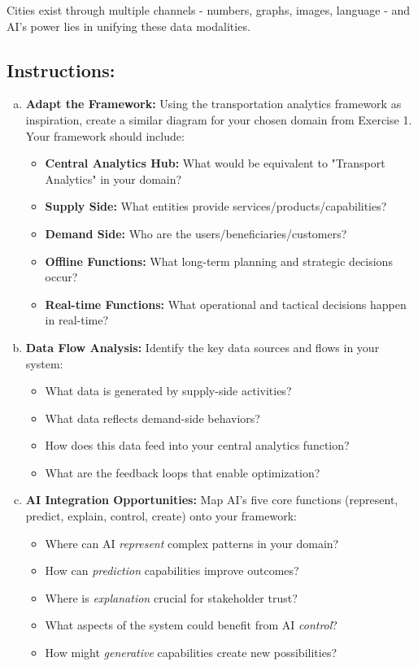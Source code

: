 \documentclass[11pt]{article}
\begin{document}
Cities exist through multiple channels - numbers, graphs, images, language - and AI's power lies in unifying these data modalities.

\subsection*{Instructions:}
\begin{enumerate}[(a)]
\item \textbf{Adapt the Framework:} Using the transportation analytics framework as inspiration, create a similar diagram for your chosen domain from Exercise 1. Your framework should include:
\begin{itemize}
\item \textbf{Central Analytics Hub:} What would be equivalent to "Transport Analytics" in your domain?
\item \textbf{Supply Side:} What entities provide services/products/capabilities?
\item \textbf{Demand Side:} Who are the users/beneficiaries/customers?
\item \textbf{Offline Functions:} What long-term planning and strategic decisions occur?
\item \textbf{Real-time Functions:} What operational and tactical decisions happen in real-time?
\end{itemize}

\item \textbf{Data Flow Analysis:} Identify the key data sources and flows in your system:
\begin{itemize}
\item What data is generated by supply-side activities?
\item What data reflects demand-side behaviors?
\item How does this data feed into your central analytics function?
\item What are the feedback loops that enable optimization?
\end{itemize}

\item \textbf{AI Integration Opportunities:} Map AI's five core functions (represent, predict, explain, control, create) onto your framework:
\begin{itemize}
\item Where can AI \textit{represent} complex patterns in your domain?
\item How can \textit{prediction} capabilities improve outcomes?
\item Where is \textit{explanation} crucial for stakeholder trust?
\item What aspects of the system could benefit from AI \textit{control}?
\item How might \textit{generative} capabilities create new possibilities?
\end{itemize}
\end{enumerate}
\end{document}
